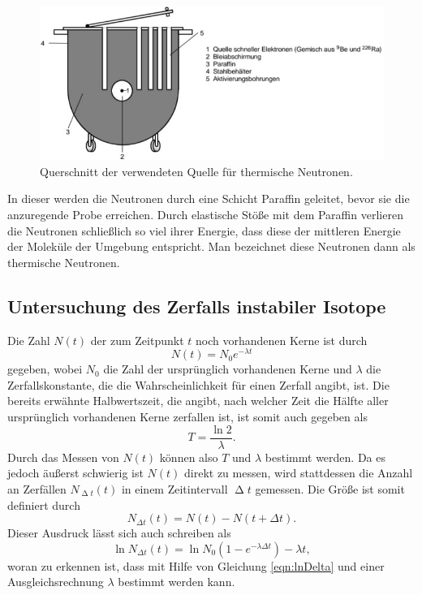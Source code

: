 \begin{figure}[H]
    \centering
    \includegraphics[width=\textwidth]{data/quellethermneutr.jpeg}
    \caption{Querschnitt der verwendeten Quelle für thermische Neutronen.}
    \label{fig:therm}
\end{figure}

In dieser werden die Neutronen durch eine Schicht Paraffin geleitet, bevor sie die anzuregende Probe erreichen. Durch elastische
Stöße mit dem Paraffin verlieren die Neutronen schließlich so viel ihrer Energie, dass diese der mittleren Energie der Moleküle der Umgebung entspricht. Man bezeichnet diese
Neutronen dann als thermische Neutronen.


\subsection{Untersuchung des Zerfalls instabiler Isotope}

Die Zahl $N(t)$ der zum Zeitpunkt $t$ noch vorhandenen Kerne ist durch
\begin{equation}
    \label{eqn:Zerfallsgesetz}
    N(t) = N_0 e^{- \lambda t}
\end{equation}
gegeben, wobei $N_0$ die Zahl der ursprünglich vorhandenen Kerne und $\lambda$ die Zerfallskonstante, die die Wahrscheinlichkeit für einen Zerfall angibt, ist.
Die bereits erwähnte Halbwertszeit, die angibt, nach welcher Zeit die Hälfte aller ursprünglich vorhandenen Kerne zerfallen ist, ist somit auch gegeben als
\begin{equation}
    \label{eqn:T}
    T = \frac{\ln{2}}{\lambda}.
\end{equation}
Durch das Messen von $N(t)$ können also $T$ und $\lambda$ bestimmt werden. Da es jedoch äußerst schwierig ist $N(t)$ direkt zu messen, wird stattdessen die Anzahl an
Zerfällen $N_{\upDelta t}(t)$ in einem Zeitintervall $\upDelta t$ gemessen. Die Größe ist somit definiert durch
\begin{equation*}
    N_{\Delta t}(t) = N(t) - N(t + \Delta t).
\end{equation*}
Dieser Ausdruck lässt sich auch schreiben als
\begin{equation}
    \label{eqn:lnDelta}
    \ln{N_{\Delta t}(t)} = \ln{N_0 (1-e^{- \lambda \Delta t})} - \lambda t,
\end{equation}
woran zu erkennen ist, dass mit Hilfe von Gleichung \eqref{eqn:lnDelta} und einer Ausgleichsrechnung $\lambda$ bestimmt werden kann.
